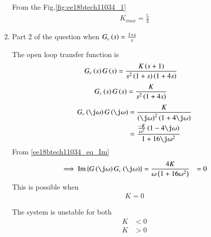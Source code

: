 \begin{enumerate}[label=\thesubsection.\arabic*.,ref=\thesubsection.\theenumi]
From the Fig.\ref{fig:ee18btech11034_1}  
\begin{align}
 K_{max} = \frac{5}{4}  
\end{align}


\solution
\item Part 2 of the question when $G_{c}\left(s\right) = \frac{1+s}{s}$

The open loop transfer function is 
\begin{align}
    G_{c}\left(s\right)G\left(s\right) &= \frac{K\left(s+1\right)}{s^2\left(1+s\right)\left(1+4s\right)}
\end{align}
\begin{align}
    G_{c}\left(s\right)G\left(s\right) &= \frac{K}{s^2\left(1+4s\right)}
\end{align}
\begin{align}
    G_{c}\brak{\j\omega}G\brak{\j\omega} &= \frac{K}{\brak{\j\omega}^2\brak{1+4\j\omega}}
    \\
    &= \frac{\frac{-K}{\omega^2}\brak{1-4\j\omega}}{1+16\j\omega^2}
\end{align}
From \eqref{ee18btech11034_eq_Im}
\begin{align}
    \implies \text{Im} \cbrak{G\brak{\j \omega}G_{c}\brak{\j\omega}} &= \frac{4K}{{\omega}\brak{1+16\omega^2}} &= 0
\end{align}
This is possible when 
\begin{align}
    K = 0
    \label{ee18btech11034_3}
\end{align}

The system is unstable for both 
\begin{align}
    K &< 0
\end{align}
\begin{align}
    K &> 0
\end{align}


\end{enumerate}
